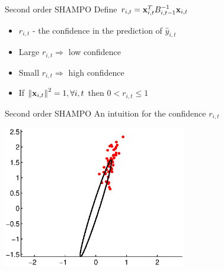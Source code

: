 \documentclass{beamer}
\begin{document}
\begin{frame}{Second order SHAMPO}
Define $r_{i,t}= \mathbf{x}_{i,t}^TB_{i,t-1}^{-1}\mathbf{x}_{i,t}$  \newline
\begin{itemize}
\item $r_{i,t}$ - the confidence  in the prediction of $\hat{y}_{i,t}$\newline
\item Large $r_{i,t}\Rightarrow$ low confidence \newline
\item Small $r_{i,t}\Rightarrow$ high confidence \newline
\item If $\left\Vert {\mathbf{x}_{i,t}} \right\Vert^2=1, \forall i,t$ then $0<r_{i,t}\le1$
\end{itemize}
\end{frame}

\begin{frame}{Second order SHAMPO}
An intuition for the confidence $r_{i,t}$
\begin{center}
\includegraphics[width=0.6\textwidth]{figs/Confidence_matrix.eps}
\end{center}
\end{frame}
\end{document}
